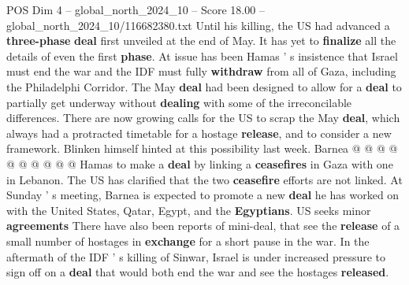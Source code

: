 \begin{textsample}{POS Dim 4 – global\_north\_2024\_10 – Score 18.00 – global\_north\_2024\_10/116682380.txt}
Until his killing, the US had advanced a \textbf{three-phase} \textbf{deal} first unveiled at the end of May.
It has yet to \textbf{finalize} all the details of even the first \textbf{phase}.
At issue has been Hamas ' s insistence that Israel must end the war and the IDF must fully \textbf{withdraw} from all of Gaza, including the Philadelphi Corridor.
The May \textbf{deal} had been designed to allow for a \textbf{deal} to partially get underway without \textbf{dealing} with some of the irreconcilable differences.
There are now growing calls for the US to scrap the May \textbf{deal}, which always had a protracted timetable for a hostage \textbf{release}, and to consider a new framework.
Blinken himself hinted at this possibility last week.
Barnea @ @ @ @ @ @ @ @ @ @ Hamas to make a \textbf{deal} by linking a \textbf{ceasefires} in Gaza with one in Lebanon.
The US has clarified that the two \textbf{ceasefire} efforts are not linked.
At Sunday ' s meeting, Barnea is expected to promote a new \textbf{deal} he has worked on with the United States, Qatar, Egypt, and the \textbf{Egyptians}.
US seeks minor \textbf{agreements} There have also been reports of mini-deal, that see the \textbf{release} of a small number of hostages in \textbf{exchange} for a short pause in the war.
In the aftermath of the IDF ' s killing of Sinwar, Israel is under increased pressure to sign off on a \textbf{deal} that would both end the war and see the hostages \textbf{released}.

\end{textsample}
